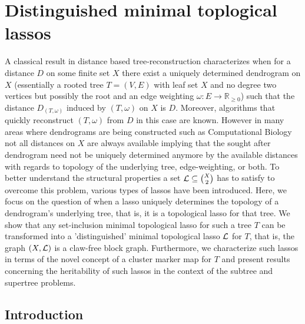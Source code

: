 \chapter{Distinguished minimal toplogical lassos}
\label{cha:dist-minim-topl}

A classical result in distance based tree-reconstruction characterizes 
when for a distance $D$ on some finite set $X$ there exist a  uniquely
determined dendrogram on $X$ (essentially a rooted tree $T=(V,E)$ with 
leaf set $X$ and no degree two vertices but possibly the root and an 
edge weighting $\omega:E\to \mathbb R_{\geq 0}$) such 
that the distance $D_{(T,\omega)}$
induced by $(T,\omega)$ on $X$ is $D$.  Moreover,
algorithms that quickly reconstruct 
 $(T,\omega)$ from $D$ in this case are known.
However in many 
areas where dendrograms are being constructed such as Computational Biology
not all distances on $X$ are always available implying that
 the sought after dendrogram 
need not be uniquely determined anymore by the available distances
with regards to topology of the underlying tree, edge-weighting, or both. 
To better understand the 
structural properties a set ${\mathcal L}\subseteq {X\choose 2}$ has to 
satisfy to overcome this problem,
various types of lassos have been introduced. 
Here, we focus on the question of when
a lasso  uniquely determines the topology of 
a dendrogram's underlying
 tree, that is, it is a topological lasso for that tree.
We show that any
set-inclusion minimal topological lasso for such a tree 
$T$ can be transformed into a 'distinguished' 
minimal topological lasso ${\mathcal L}$ for $T$, that is, 
the graph $(X,{\mathcal L})$ is a claw-free block graph. Furthermore, we
characterize such lassos in terms of the novel concept
of a cluster marker map for $T$ and present results concerning 
the heritability of such lassos in the context of the subtree 
and supertree problems.

\section{Introduction}

